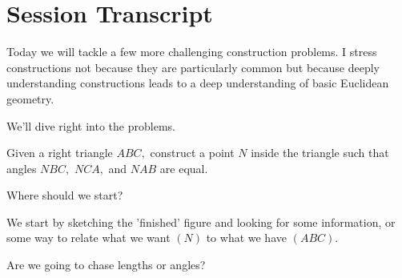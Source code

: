 
\section{Session Transcript}
Today we will tackle a few more challenging construction problems. I stress constructions not because they are particularly common but because deeply understanding constructions leads to a deep understanding of basic Euclidean geometry.

We'll dive right into the problems.

\begin{example}
    Given a right triangle $ABC,$ construct a point $N$ inside the triangle such that angles $NBC,$ $NCA,$ and $NAB$ are equal.    
\end{example}

Where should we start?









We start by sketching the 'finished' figure and looking for some information, or some way to relate what we want $(N)$ to what we have $(ABC).$

Are we going to chase lengths or angles?



